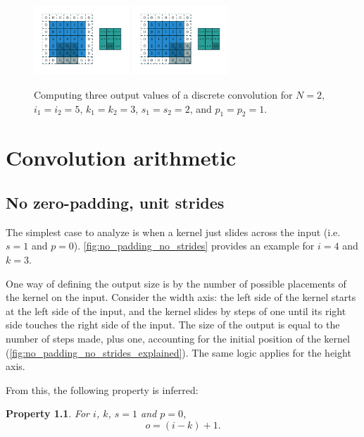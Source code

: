 \documentclass{report}
\newtheorem{prop}{Property}
\begin{document}
\begin{figure}[p]
    \includegraphics[width=0.32\textwidth]{pdf/numerical_padding_strides_07.pdf}
    \includegraphics[width=0.32\textwidth]{pdf/numerical_padding_strides_08.pdf}
    \caption{\label{fig:numerical_padding_strides} Computing three output values
        of a discrete convolution for $N = 2$, $i_1 = i_2 = 5$, $k_1 = k_2 = 3$,
        $s_1 = s_2 = 2$, and $p_1 = p_2 = 1$.}
\end{figure}

\chapter{Convolution arithmetic}

\section{No zero-padding, unit strides}

The simplest case to analyze is when a kernel just slides across the input (i.e.
$s = 1$ and $p = 0$). \autoref{fig:no_padding_no_strides} provides an example
for $i = 4$ and $k = 3$.

One way of defining the output size is by the number of possible placements of
the kernel on the input. Consider the width axis: the left side of the kernel
starts at the left side of the input, and the kernel slides by steps of one
until its right side touches the right side of the input. The size of the output
is equal to the number of steps made, plus one, accounting for the initial
position of the kernel (\autoref{fig:no_padding_no_strides_explained}). The same
logic applies for the height axis.

From this, the following property is inferred:

\begin{prop}\label{prop:no_padding_no_strides}
For $i$, $k$, $s = 1$ and $p = 0$,
\begin{equation*}
    o = (i - k) + 1.
\end{equation*}
\end{prop}
\end{document}
